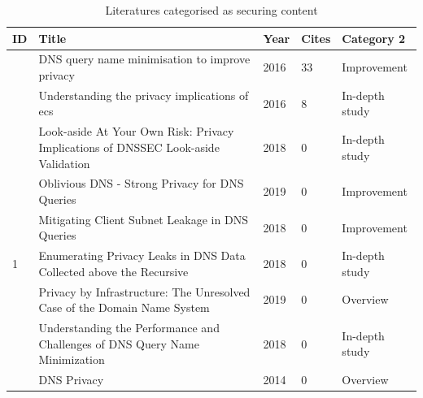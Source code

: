 \documentclass[a4paper,12pt]{article}
\begin{document}
\begin{table}[h!]
    \begin{tabular}{ | l | p{9cm} | l | l | l | }
        \hline
            ID & Title & Year & Cites & Category 2 \\ \hline
            \cite{bortzmeyer2016dns} & DNS query name minimisation to improve privacy & 2016 & 33 & Improvement \\ \hline
            \cite{kintis2016understanding} & Understanding the privacy implications of ecs & 2016 & 8 & In-depth study \\ \hline
            \cite{mohaisen2018look} & Look-aside At Your Own Risk: Privacy Implications of DNSSEC Look-aside Validation & 2018 & 0 & In-depth study \\ \hline
            \cite{annee-dprive-oblivious-dns-00} & Oblivious DNS - Strong Privacy for DNS Queries & 2019 & 0 & Improvement \\ \hline
            \cite{pan2018mitigating} & Mitigating Client Subnet Leakage in DNS Queries & 2018 & 0 & Improvement \\ \hline
            1 & Enumerating Privacy Leaks in DNS Data Collected above the Recursive & 2018 & 0 & In-depth study \\ \hline
            \cite{bradshaw2019privacy} & Privacy by Infrastructure: The Unresolved Case of the Domain Name System & 2019 & 0 & Overview \\ \hline
            \cite{wang2018understanding} & Understanding the Performance and Challenges of DNS Query Name Minimization & 2018 & 0 & In-depth study \\ \hline
            \cite{werneck2014dns} & DNS Privacy & 2014 & 0 & Overview \\ \hline
        \end{tabular}
        \caption{Literatures categorised as securing content}
\label{content}
\end{table}
\end{document}
